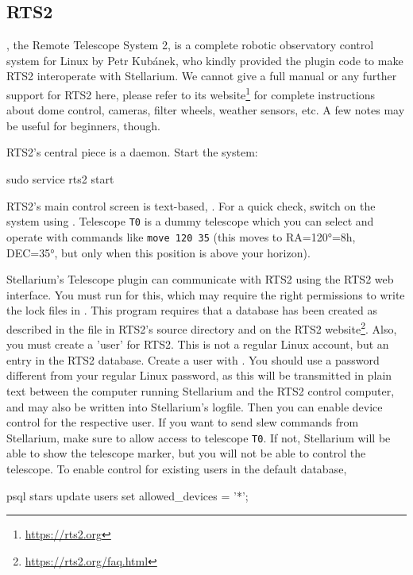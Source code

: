 \subsection{RTS2}
\label{sec:plugins:TelescopeControl:RTS2}

, the Remote Telescope System 2, is a complete robotic observatory control system for Linux 
by Petr Kub\'{a}nek, who kindly provided the plugin code to make RTS2 interoperate with Stellarium.
We cannot give a full manual or any further support for RTS2 here, please refer to its website\footnote{\url{https://rts2.org}} 
for complete instructions about dome control, cameras, filter wheels, weather sensors, etc. 
A few notes may be useful for beginners, though. 

RTS2's central piece is a daemon. Start the system:
\begin{commands}
sudo service rts2 start
\end{commands}
RTS2's main control screen is text-based, . For a quick check, switch on the system using . 
Telescope \texttt{T0} is a dummy telescope which you can select and operate with commands like \texttt{move 120 35} 
(this moves to RA=120°=8h, DEC=35°, but only when this position is above your horizon).

Stellarium's Telescope plugin can communicate with RTS2 using the RTS2 web interface. You must run  for this, 
which may require the right permissions to write the lock files in . This program requires 
that a database has been created as described in the file  in RTS2's source directory and on the RTS2 website\footnote{\url{https://rts2.org/faq.html}}.   
Also, you must create a 'user' for RTS2. This is not a regular Linux account, but an entry in the RTS2 database. 
Create a user with . You should use a password different from your regular Linux password, 
as this will be transmitted in plain text between the computer running Stellarium and the RTS2 control computer, 
and may also be written into Stellarium's logfile. Then you can enable device control for the respective user. 
If you want to send slew commands from Stellarium, make sure to allow access to telescope \texttt{T0}. 
If not, Stellarium will be able to show the telescope marker, but you will not be able to control the telescope. 
To enable control for existing users in the default  database, 
\begin{commands}
psql stars
update users set allowed_devices = '*';
\end{commands}

